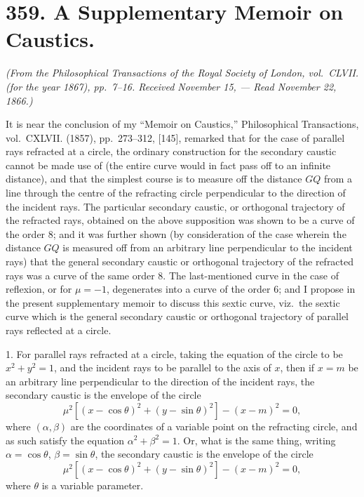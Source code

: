 \documentclass[11pt,a4paper]{article}
\theoremstyle{plain}
\begin{document}
\section*{359. A Supplementary Memoir on Caustics.\quad [359]}
\label{sec:359}

\begin{flushright}
\textit{(From the Philosophical Transactions of the Royal Society of London, vol.~CLVII. (for the year 1867), pp.~7--16. Received November 15, --- Read November 22, 1866.)}
\end{flushright}

It is near the conclusion of my ``Memoir on Caustics,'' Philosophical Transactions, vol.~CXLVII. (1857), pp.~273--312, [145], remarked that for the case of parallel rays refracted at a circle, the ordinary construction for the secondary caustic cannot be made use of (the entire curve would in fact pass off to an infinite distance), and that the simplest course is to measure off the distance $GQ$ from a line through the centre of the refracting circle perpendicular to the direction of the incident rays. The particular secondary caustic, or orthogonal trajectory of the refracted rays, obtained on the above supposition was shown to be a curve of the order 8; and it was further shown (by consideration of the case wherein the distance $GQ$ is measured off from an arbitrary line perpendicular to the incident rays) that the general secondary caustic or orthogonal trajectory of the refracted rays was a curve of the same order 8. The last-mentioned curve in the case of reflexion, or for $\mu = -1$, degenerates into a curve of the order 6; and I propose in the present supplementary memoir to discuss this sextic curve, viz.\ the sextic curve which is the general secondary caustic or orthogonal trajectory of parallel rays reflected at a circle.

1. For parallel rays refracted at a circle, taking the equation of the circle to be $x^2 + y^2 = 1$, and the incident rays to be parallel to the axis of $x$, then if $x = m$ be an arbitrary line perpendicular to the direction of the incident rays, the secondary caustic is the envelope of the circle
\[
\mu^2[(x - \cos\theta)^2 + (y - \sin\theta)^2] - (x - m)^2 = 0,
\]
where $(\alpha, \beta)$ are the coordinates of a variable point on the refracting circle, and as such satisfy the equation $\alpha^2 + \beta^2 = 1$. Or, what is the same thing, writing $\alpha = \cos\theta$, $\beta = \sin\theta$, the secondary caustic is the envelope of the circle
\[
\mu^2[(x - \cos\theta)^2 + (y - \sin\theta)^2] - (x - m)^2 = 0,
\]
where $\theta$ is a variable parameter.
\end{document}
